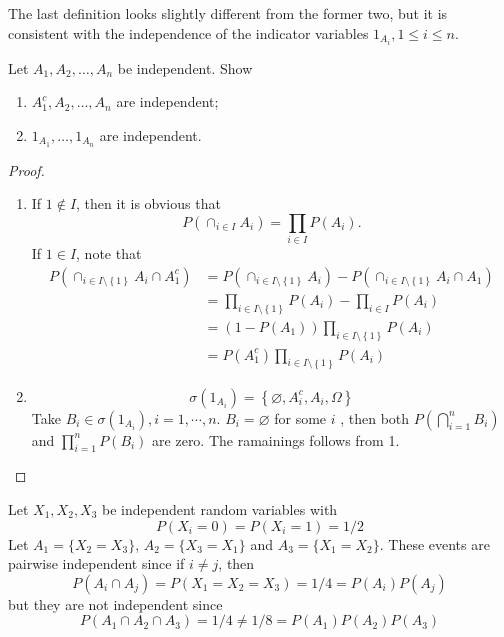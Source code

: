 \documentclass[../main.tex]{subfiles}
\begin{document}
\begin{remark}
    The last definition looks slightly different from the former two, but it is consistent with the independence of the indicator variables \(  1_{A_{i}},1\le i\le n  \).  
\end{remark}
\begin{exercise}{}{}
Let $A_1, A_2, \dots, A_n$ be independent. Show
\begin{enumerate}
    \item $A_1^c, A_2, \dots, A_n$ are independent;
    \item $1_{A_1}, \dots, 1_{A_n}$ are independent.
\end{enumerate}
\end{exercise}
\begin{proof}
  \begin{enumerate}
    \item   If \(  1\not \in I  \), then it is obvious that  \[
    P\left( \cap _{i\in I}A_{i} \right)= \prod _{i\in I}P\left( A_{i} \right).   
    \]  If \(  1 \in I  \), note that    \[
   \begin{aligned}
    P\left( \cap _{i \in I\setminus \left\{ 1 \right\}}A_{i}\cap  A_{1} ^{c}\right)&=  P\left( \cap _{i \in I\setminus \left\{ 1 \right\}} A_{i}\right)-  P\left( \cap _{i \in I\setminus \left\{ 1 \right\}}A_{i}\cap A_{1} \right)  \\ 
     &=  \prod _{i\in I\setminus \left\{ 1 \right\}}P\left( A_{i} \right)-\prod _{ i\in I}P\left( A_{i} \right)   \\ 
      &=  \left( 1-P\left( A_{1} \right)  \right)\prod _{ i \in I\setminus \left\{ 1 \right\}} P\left( A_{i} \right)\\ 
       &=  P\left( A_{1}^{c} \right)\prod _{i \in I\setminus \left\{ 1 \right\}}P\left( A_{i} \right)   
   \end{aligned}
    \]
    \item  \[
     \sigma \left( 1_{A_{i}} \right) = \left\{ \varnothing,A_{i}^{c},A_{i}, \Omega  \right\}
    \]  Take \(  B_{i}\in  \sigma \left( 1_{A_{i}} \right), i=  1,\cdots,n    \).  \(  B_{i}= \varnothing  \) for some \(  i  \)   , then both \(  P\left( \bigcap_{i= 1}^{n}B_{i}  \right)   \) and \(  \prod _{i= 1}^{n}P\left( B_{i} \right)   \) are zero.   The ramainings follows from 1. 
  \end{enumerate}
  
\end{proof}

\begin{example}{}{}
Let $X_1, X_2, X_3$ be independent random variables with
\[
P(X_i = 0) = P(X_i = 1) = 1/2
\]
Let $A_1 = \{X_2 = X_3\}$, $A_2 = \{X_3 = X_1\}$ and $A_3 = \{X_1 = X_2\}$. These events are
pairwise independent since if $i \neq j$, then
\[
P(A_i \cap A_j) = P(X_1 = X_2 = X_3) = 1/4 = P(A_i)P(A_j)
\]
but they are not independent since
\[
P(A_1 \cap A_2 \cap A_3) = 1/4 \neq 1/8 = P(A_1)P(A_2)P(A_3)
\]
\end{example}
\end{document}
